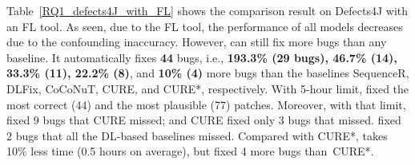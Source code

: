 Table~\ref{RQ1_defects4J_with_FL} shows the comparison result on
Defects4J with an FL tool. As seen, due to the FL tool, the performance
of all models decreases due to the confounding inaccuracy. However,
{\tool} can still fix more bugs than any baseline. It automatically
fixes {\bf 44} bugs, i.e., {\bf 193.3\% (29 bugs), 46.7\% (14), 33.3\%
  (11), 22.2\% (8)}, and {\bf 10\% (4)} more bugs than the baselines
SequenceR, DLFix, CoCoNuT, CURE, and CURE*, respectively. With 5-hour
limit, {\tool} fixed the most correct (44) and the most plausible (77)
patches. Moreover, with that limit, {\tool} fixed 9 bugs that
CURE missed; and CURE fixed only 3 bugs that {\tool}
missed. {\tool} fixed 2 bugs that all the DL-based baselines
missed. Compared with CURE*, {\tool} takes 10\% less time (0.5 hours
on average), but fixed 4 more bugs than~CURE*.




%










